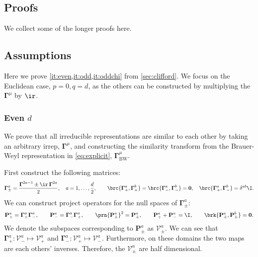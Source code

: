 \documentclass[11pt]{article}
\newcommand{\Gammab}{\boldsymbol{\Gamma}}
\begin{document}
\begin{appendix}

\section{Proofs}\label{sec:proofs}

We collect some of the longer proofs here.



\subsection{Assumptions}\label{sec:assume}

Here we prove \cref{it:even,it:odd,it:oddchi} from \cref{sec:clifford}.
We focus on the Euclidean case, \(p = 0, q = d\), as the others can be constructed by multiplying the \(\Gammab^\mu\) by \(\ir\).


\subsubsection{Even \texorpdfstring{\(d\)}{d}}\label{sec:evenclass}

We prove that all irreducible representations are similar to each other by taking an arbitrary irrep, \(\Gammab^\mu\), and constructing the similarity transform from the Brauer-Weyl representation in \cref{eq:explicit}, \(\Gammab^\mu_\text{BW}\).

First construct the following matrices:
%
\begin{equation}\label{eq:raiselower}
  \Gammab^a_\pm = \frac{\Gammab^{2a-1} \pm \ir \, \Gammab^{2a}}{2},
  \quad a = 1,\dots,\frac{d}{2}, \qquad
  \brc{\Gammab_+^a, \Gammab_+^b} = \brc{\Gammab_-^a, \Gammab_-^b} = \mathbf{0},
  \quad \brc{\Gammab_+^a, \Gammab_-^b} = \delta^{ab} \I.
\end{equation}
%
We can construct project operators for the null spaces of \(\Gammab^a_\pm\):
%
\begin{equation*}
  \mathbf{P}^a_+ = \Gammab^a_+ \Gammab^a_-, \qquad
  \mathbf{P}^a_- = \Gammab^a_- \Gammab^a_+, \qquad
  \prn{\mathbf{P}^a_\pm}^2 = \mathbf{P}^a_\pm, \qquad
  \mathbf{P}^a_+ + \mathbf{P}^a_- = \I, \qquad
  \brk{\mathbf{P}^a_\pm, \mathbf{P}^b_\pm} = \mathbf{0}. 
\end{equation*}
%
We denote the subspaces corresponding to \(\mathbf{P}^a_\pm\) as \(\mathcal{V}^a_\pm\).
We can see that \( \Gammab^a_+ : \mathcal{V}^a_- \longmapsto \mathcal{V}^a_+ \) and \( \Gammab^a_- : \mathcal{V}^a_+ \longmapsto \mathcal{V}^a_- \).
Furthermore, on these domains the two maps are each others' inverses.
Therefore, the \(\mathcal{V}^a_\pm\) are half dimensional.


\end{appendix}
\end{document}
